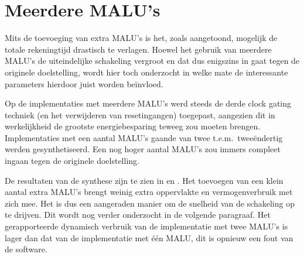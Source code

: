 \section{Meerdere MALU's\label{sectie-resulaten-MALU's}}

Mits de toevoeging van extra MALU's is het, zoals aangetoond, mogelijk de totale rekeningtijd drastisch te verlagen. Hoewel het gebruik van meerdere MALU's de uiteindelijke schakeling vergroot en dat dus enigszins in gaat tegen de originele doelstelling, wordt hier toch onderzocht in welke mate de interessante parameters hierdoor juist worden be\"invloed.

Op de implementaties met meerdere MALU's werd steeds de derde clock gating techniek (en het verwijderen van resetingangen) toegepast, aangezien dit in werkelijkheid de grootste energiebesparing teweeg zou moeten brengen. Implementaties met een aantal MALU's gaande van twee t.e.m.\ twee\"endertig werden gesynthetiseerd. Een nog hoger aantal MALU's zou immers compleet ingaan tegen de originele doelstelling.

De resultaten van de synthese zijn te zien in  en . Het toevoegen van een klein aantal extra MALU's brengt weinig extra oppervlakte en vermogenverbruik met zich mee. Het is dus een aangeraden manier om de snelheid van de schakeling op te drijven. Dit wordt nog verder onderzocht in de volgende paragraaf. Het gerapporteerde dynamisch verbruik van de implementatie met twee MALU's is lager dan dat van de implementatie met \'e\'en MALU, dit is opnieuw een fout van de software.

